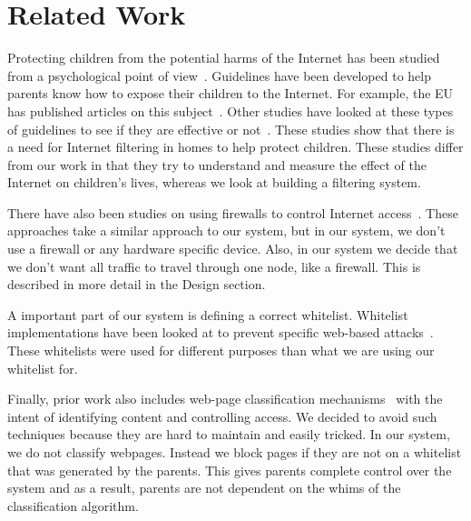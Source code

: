 
\section{Related Work}

Protecting children from the potential harms of the Internet has been studied
from a psychological point of view~\cite{ybarra2005exposure, ho_statistical}.
Guidelines have been developed to help parents know how to expose their
children to the Internet. For example, the EU has published articles on this
subject~\cite{holloway2013zero, livingstone2010risks}. Other studies have
looked at these types of guidelines to see if they are effective or
not~\cite{livingstone2008parental}. These studies show that there is a need for
Internet filtering in homes to help protect children. These studies differ from
our work in that they try to understand and measure the effect of the Internet
on children's lives, whereas we look at building a filtering system.

There have also been studies on using firewalls to control Internet
access~\cite{ivanovic, nguyen}. These approaches take a similar approach to
our system, but in our system, we don't use a firewall or any hardware specific
device. Also, in our system we decide that we don't want all traffic to travel
through one node, like a firewall. This is described in more detail in the
Design section.

A important part of our system is defining a correct whitelist. Whitelist
implementations have been looked at to prevent specific web-based
attacks~\cite{han_automated_whitelist, iha_implementation}. These whitelists
were used for different purposes than what we are using our whitelist for.

Finally, prior work also includes web-page classification
mechanisms~\cite{baykan_et_al_url_based_classification,
chen_et_al_novel_web_page_filtering, ho_statistical} with the intent of
identifying content and controlling access. We decided to avoid such techniques
because they are hard to maintain and easily tricked. In our system, we do not
classify webpages. Instead we block pages if they are not on a whitelist that
was generated by the parents.  This gives parents complete control over the
system and as a result, parents are not dependent on the whims of the
classification algorithm.
